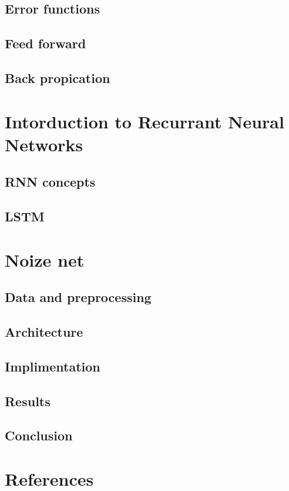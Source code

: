 \documentclass{article}
\begin{document}
\label{sec:activationfuncs}

\subsection{Error functions}
\label{sec:error}

\subsection{Feed forward}
\label{sec:forward}

\subsection{Back propication}
\label{sec:back}


\section{Intorduction to Recurrant Neural Networks}
\label{sec:intoRNNs}
\subsection{RNN concepts}
\label{sec:RNNS}
\subsection{LSTM}
\label{sec:LSTM}

\section{Noize net}
\label{sec:nn}
\subsection{Data and preprocessing}
\label{sec:data}
\subsection{Architecture}
\label{sec:arch}
\subsection{Implimentation}
\label{sec:impl}
\subsection{Results}
\label{sec:results}
\subsection{Conclusion}
\label{sec:conclusion}

\section{References}
\end{document}

